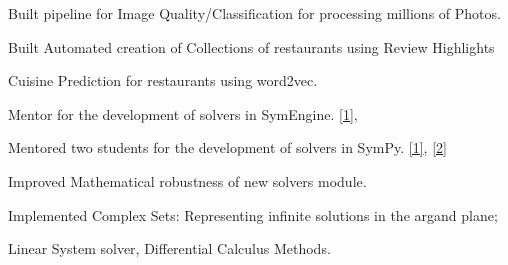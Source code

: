\documentclass[]{deedy-resume-openfont}
\begin{document}
\begin{minipage}[t]{0.66\textwidth}
\vspace{\topsep} %
\begin{tightemize}
\item Built pipeline for Image Quality/Classification for processing millions of Photos.
\item Built Automated creation of Collections of restaurants using Review Highlights
\item Cuisine Prediction for restaurants using word2vec.
\end{tightemize}
\sectionsep



\vspace{\topsep} %
\begin{tightemize}
\item Mentor for the development of solvers in SymEngine. \href{https://summerofcode.withgoogle.com/projects/#4873488388063232}{[1]}, 


\item Mentored two students for the development of solvers in SymPy. \href{https://summerofcode.withgoogle.com/projects/#6299625891823616}{[1]}, 
\href{https://summerofcode.withgoogle.com/projects/#5440294841483264}{[2]}
\end{tightemize}
\sectionsep

\begin{tightemize}
\item Improved Mathematical robustness of new solvers module.
\item Implemented Complex Sets: Representing infinite solutions in the argand plane;
\item Linear System solver, Differential Calculus Methods.\end{tightemize}
\sectionsep


\end{minipage}
\end{document}

